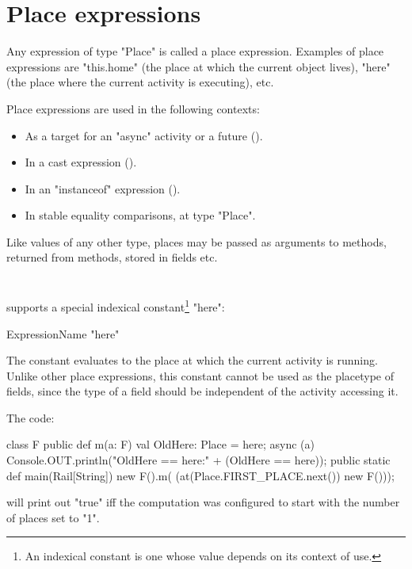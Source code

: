 \section{Place expressions}
Any expression of type \xcd"Place" is called a place expression. 
Examples of place expressions are \xcd"this.home" (the place
at which the current object lives), \xcd"here"
(the place where the current activity is executing), etc.

Place expressions are used in the following contexts: 
\begin{itemize}
\item As a target for an \xcd"async" activity or a future
().
\item In a cast expression ().
\item In an \xcd"instanceof" expression ().
\item In stable equality comparisons, at type \xcd"Place".
\end{itemize}

Like values of any other type, places may be passed as arguments
to methods, returned from methods, stored in fields etc.

\section{}\label{Here}
\Xten{} supports a special indexical constant\footnote{
An indexical constant is one whose value depends on its context
of use.} \xcd"here":

\begin{grammar}
ExpressionName \: \xcd"here" \\
\end{grammar}

The constant evaluates to the place at which the current activity is
running. Unlike other place expressions, this constant cannot be 
used as the placetype of fields, since the type of a field 
should be independent of the activity accessing it.

\begin{example}


The code:

\begin{xten}
class F {
  public def m(a: F) {
    val OldHere: Place = here;
    async (a) {
      Console.OUT.println("OldHere == here:" 
                         + (OldHere == here));
    }
  }
  public static def main(Rail[String]) {
    new F().m( (at(Place.FIRST_PLACE.next()) new F()));
  }
}  
\end{xten}
%


\noindent will print out \xcd"true" iff the computation was configured
to start with the number of places set to \xcd"1". 
\end{example}

